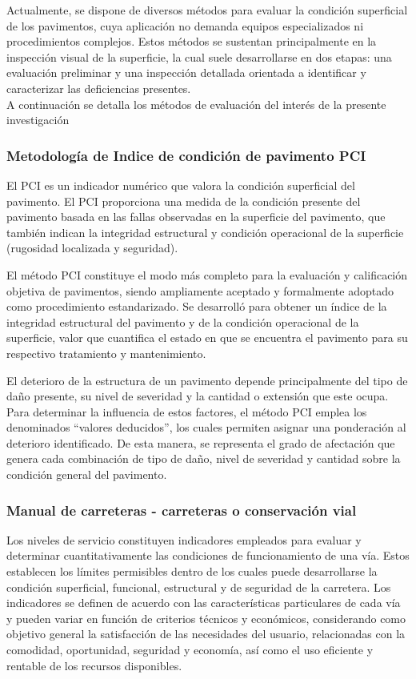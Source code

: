 Actualmente, se dispone de diversos métodos para evaluar la condición superficial de los pavimentos, cuya aplicación no demanda equipos especializados ni procedimientos complejos. Estos métodos se sustentan principalmente en la inspección visual de la superficie, la cual suele desarrollarse en dos etapas: una evaluación preliminar y una inspección detallada orientada a identificar y caracterizar las deficiencias presentes.\\
A continuación se detalla los métodos de evaluación del interés de la presente investigación 
\subsubsection{Metodología de Indice de condición de pavimento PCI}
El PCI es un indicador numérico que valora la condición superficial del pavimento. El PCI proporciona una medida de la condición presente del pavimento basada en las fallas observadas en la superficie del pavimento, que también indican la integridad estructural y condición operacional de la superficie (rugosidad localizada y seguridad). \textcite{T6433D}

El método PCI constituye el modo más completo para la evaluación y calificación objetiva de pavimentos, siendo ampliamente aceptado y formalmente adoptado como procedimiento estandarizado. Se desarrolló para obtener un índice de la integridad estructural del pavimento y de la condición operacional de la superficie, valor que cuantifica el estado en que se encuentra el pavimento para su respectivo tratamiento y mantenimiento.\textcite{Franklin2019}

El deterioro de la estructura de un pavimento depende principalmente del tipo de daño presente, su nivel de severidad y la cantidad o extensión que este ocupa. Para determinar la influencia de estos factores, el método PCI emplea los denominados “valores deducidos”, los cuales permiten asignar una ponderación al deterioro identificado. De esta manera, se representa el grado de afectación que genera cada combinación de tipo de daño, nivel de severidad y cantidad sobre la condición general del pavimento.

\subsubsection{Manual de carreteras - carreteras o conservación vial}

Los niveles de servicio constituyen indicadores empleados para evaluar y determinar cuantitativamente las condiciones de funcionamiento de una vía. Estos establecen los límites permisibles dentro de los cuales puede desarrollarse la condición superficial, funcional, estructural y de seguridad de la carretera. Los indicadores se definen de acuerdo con las características particulares de cada vía y pueden variar en función de criterios técnicos y económicos, considerando como objetivo general la satisfacción de las necesidades del usuario, relacionadas con la comodidad, oportunidad, seguridad y economía, así como el uso eficiente y rentable de los recursos disponibles.

